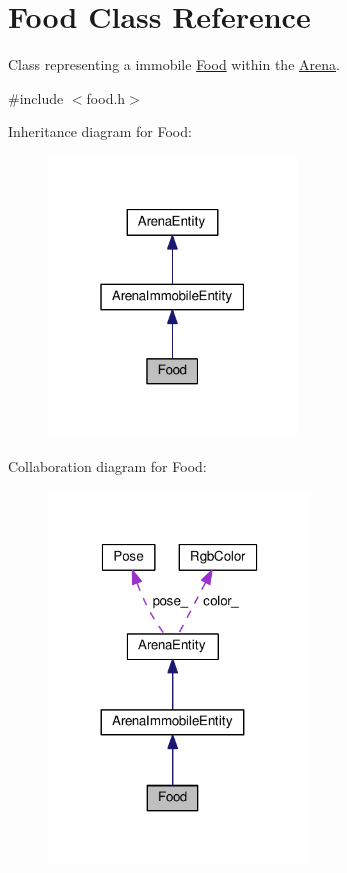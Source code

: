 \hypertarget{classFood}{}\section{Food Class Reference}
\label{classFood}


Class representing a immobile \hyperlink{classFood}{Food} within the \hyperlink{classArena}{Arena}.  




{\ttfamily \#include $<$food.\+h$>$}



Inheritance diagram for Food\+:\nopagebreak
\begin{figure}[H]
\begin{center}
\leavevmode
\includegraphics[width=187pt]{classFood__inherit__graph}
\end{center}
\end{figure}


Collaboration diagram for Food\+:\nopagebreak
\begin{figure}[H]
\begin{center}
\leavevmode
\includegraphics[width=197pt]{classFood__coll__graph}
\end{center}
\end{figure}

